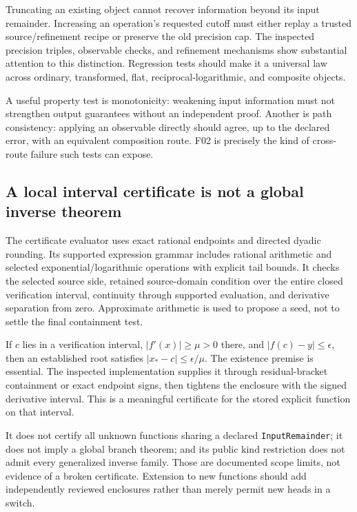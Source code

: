 Truncating an existing object cannot recover information beyond its input remainder. Increasing an operation's requested cutoff must either replay a trusted source/refinement recipe or preserve the old precision cap. The inspected precision triples, observable checks, and refinement mechanisms show substantial attention to this distinction. Regression tests should make it a universal law across ordinary, transformed, flat, reciprocal-logarithmic, and composite objects.\cite{operations,guide}

A useful property test is monotonicity: weakening input information must not strengthen output guarantees without an independent proof. Another is path consistency: applying an observable directly should agree, up to the declared error, with an equivalent composition route. F02 is precisely the kind of cross-route failure such tests can expose.

\subsection{A local interval certificate is not a global inverse theorem}

The certificate evaluator uses exact rational endpoints and directed dyadic rounding. Its supported expression grammar includes rational arithmetic and selected exponential/logarithmic operations with explicit tail bounds. It checks the selected source side, retained source-domain condition over the entire closed verification interval, continuity through supported evaluation, and derivative separation from zero. Approximate arithmetic is used to propose a seed, not to settle the final containment test.\cite{certificates}

If $c$ lies in a verification interval, $|f'(x)|\ge\mu>0$ there, and $|f(c)-y|\le\epsilon$, then an established root satisfies $|x_*-c|\le\epsilon/\mu$. The existence premise is essential. The inspected implementation supplies it through residual-bracket containment or exact endpoint signs, then tightens the enclosure with the signed derivative interval. This is a meaningful certificate for the stored explicit function on that interval.

It does not certify all unknown functions sharing a declared \texttt{InputRemainder}; it does not imply a global branch theorem; and its public kind restriction does not admit every generalized inverse family. Those are documented scope limits, not evidence of a broken certificate. Extension to new functions should add independently reviewed enclosures rather than merely permit new heads in a switch.


